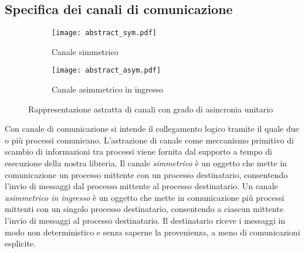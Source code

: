 \subsection{Specifica dei canali di comunicazione}
\label{sct:specif_meccanismi_intro}
\begin{figure}[!t]
  \begin{subfigure}[b]{.5\textwidth}
    \centering
    \texttt{[image: abstract\_sym.pdf]}
    \caption{Canale simmetrico}
    \label{fig:abstract_channel_sym}
  \end{subfigure}
  \begin{subfigure}[b]{.5\textwidth}
    \centering
    \texttt{[image: abstract\_asym.pdf]}
    \caption{Canale asimmetrico in ingresso}
    \label{fig:abstract_channel_asym}
  \end{subfigure}
  \caption[Canali di comunicazione tra processi]{Rappresentazione astratta di canali con grado di asincronia unitario}
  \label{fig:abstract_channels}
\end{figure}




Con canale di comunicazione si intende il collegamento logico tramite il quale due o pi\`u processi comunicano. L'astrazione di canale come meccanismo primitivo di scambio di informazioni tra processi viene fornita dal supporto a tempo di esecuzione della nostra libreria. Il canale \emph{simmetrico} \`e un oggetto che mette in comunicazione un processo mittente con un processo destinatario, consentendo l'invio di messaggi dal processo mittente al processo destinatario. Un canale \emph{asimmetrico in ingresso} \`e un oggetto che mette in comunicazione pi\`u processi mittenti con un singolo processo destinatario, consentendo a ciascun mittente l'invio di messaggi al processo destinatario. Il destinatario riceve i messaggi in modo non deterministico e senza saperne la provenienza, a meno di comunicazioni esplicite. 

